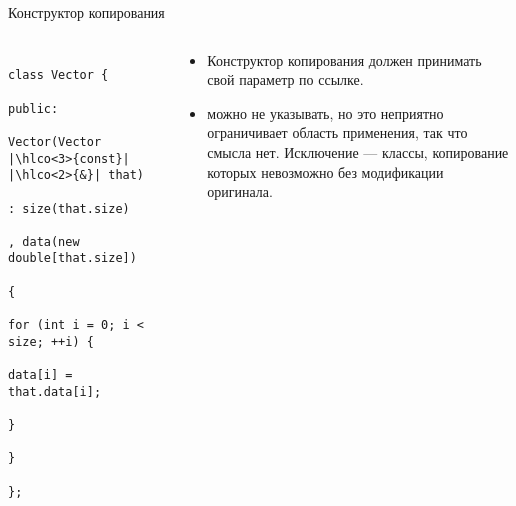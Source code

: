\documentclass[aspectratio=169,14pt]{beamer}
\begin{document}
    \begin{frame}[fragile]{Конструктор копирования}
        \begin{columns}[T]
            \begin{column}{0.6\textwidth}
                \begin{verbatim}
                    class Vector {
                    public:
                        Vector(Vector |\hlco<3>{const}| |\hlco<2>{&}| that)
                            : size(that.size)
                            , data(new double[that.size])
                        {
                            for (int i = 0; i < size; ++i) {
                                data[i] = that.data[i];
                            }
                        }
                    };
                \end{verbatim}
            \end{column}
            \begin{column}{0.4\textwidth}
                \footnotesize
                \begin{itemize}
                    \item<2-> Конструктор копирования должен принимать свой параметр по ссылке.
                    \item<3->  можно не указывать,
                        но это неприятно ограничивает область применения, так что смысла нет.
                        Исключение --- классы, копирование которых невозможно без модификации оригинала.
                \end{itemize}
            \end{column}
        \end{columns}
    \end{frame}

\end{document}
